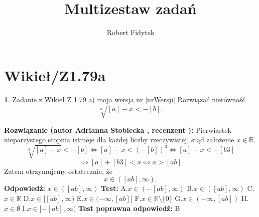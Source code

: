 \documentclass[12pt, a4paper]{article}
\title{Multizestaw zadań}
\author{Robert Fidytek}
\date{}
\theoremstyle{definition} %
\newtheorem{zad}{}
\newcommand{\kategoria}[1]{\section{#1}} %
\newcommand{\zadStart}[1]{\begin{zad}#1\newline} %
\newcommand{\zadStop}{\end{zad}}   %
\newcommand{\rozwStart}[2]{\noindent \textbf{Rozwiązanie (autor #1 , recenzent #2): }\newline} %
\newcommand{\rozwStop}{\newline}                                            %
\newcommand{\odpStart}{\noindent \textbf{Odpowiedź:}\newline}    %
\newcommand{\odpStop}{\newline}                                             %
\newcommand{\testStart}{\noindent \textbf{Test:}\newline} %
\newcommand{\testStop}{\newline} %
\newcommand{\kluczStart}{\noindent \textbf{Test poprawna odpowiedź:}\newline} %
\newcommand{\kluczStop}{\newline} %
\begin{document}
\maketitle


\kategoria{Wikieł/Z1.79a}
\zadStart{Zadanie z Wikieł Z 1.79 a) moja wersja nr [nrWersji]}
%
Rozwiązać nierówność
$$\sqrt[3]{[a]-x}<-[b].$$
\zadStop
\rozwStart{Adrianna Stobiecka}{}
Pierwiastek nieparzystego stopnia istnieje dla każdej liczby rzeczywistej, stąd założenie $x\in\mathbb{R}$.
$$\sqrt[3]{[a]-x}<-[b]\Leftrightarrow[a]-x<(-[b])^3\Leftrightarrow[a]-x<-[b3]$$
$$\Leftrightarrow[a]+[b3]<x\Leftrightarrow x>[ab]$$
Zatem otrzymujemy ostatecznie, że 
$$x\in([ab],\infty).$$
\rozwStop
\odpStart
$x\in([ab],\infty)$
\odpStop
\testStart
A.$x\in(-[ab],\infty)$
B.$x\in([ab],\infty)$
C.$x\in\mathbb{R}$
D.$x\in[[ab],\infty)$
E.$x\in(-\infty,[ab]]$
F.$x\in\mathbb{R}\setminus\{0\}$
G.$x\in(-\infty,[ab])$
H.$x\in\emptyset$
I.$x\in[-[ab],\infty)$
\testStop
\kluczStart
B
\kluczStop
\end{document}
